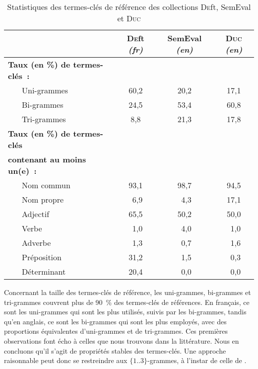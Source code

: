       \begin{table}[!h]
        \centering
        \begin{tabular}{ll|ccc}
          \toprule
          & & \textbf{\textsc{De}ft} \textit{(fr)} & \textbf{SemEval} \textit{(en)} & \textbf{\textsc{Duc}} \textit{(en)}\\
          \hline
          \multicolumn{2}{l|}{\textbf{Taux (en \%) de termes-clés~:}}\\
          & Uni-grammes & 60,2 & 20,2 & 17,1\\
          & Bi-grammes & 24,5 & 53,4 & 60,8\\
          & Tri-grammes & 8,8 & 21,3 & 17,8\\
          \hline
          \multicolumn{2}{l|}{\textbf{Taux (en \%) de termes-clés}} & & &\\
          \multicolumn{2}{l|}{\textbf{contenant au moins un(e)~:}} & & &\\
          & Nom commun & 93,1 & 98,7 & 94,5\\
          & Nom propre & $~~$6,9 & $~~$4,3 & 17,1\\
          & Adjectif & 65,5 & 50,2 & 50,0\\
          & Verbe & $~~$1,0 & $~~$4,0 & $~~$1,0\\
          & Adverbe & $~~$1,3 & $~~$0,7 & $~~$1,6\\
          & Préposition & 31,2 & $~~$1,5 & $~~$0,3\\
          & Déterminant & 20,4 & $~~$0,0 & $~~$0,0\\
          \bottomrule
        \end{tabular}
        \caption{Statistiques des termes-clés de référence des
                 collections \textsc{De}ft, SemEval et \textsc{Duc}
                 \label{tab:candidate_selection-train_stats}}
      \end{table}

      Concernant la taille des termes-clés de référence, les uni-grammes,
      bi-grammes et tri-grammes couvrent plus de 90~\% des termes-clés de
      références. En français, ce sont les uni-grammes qui sont les plus
      utilisés, suivis par les bi-grammes, tandis qu'en anglais, ce sont les
      bi-grammes qui sont les plus employés, avec des proportions équivalentes
      d'uni-grammes et de tri-grammes. Ces premières observations font écho à
      celles que nous trouvons dans la littérature. Nous en concluons qu'il
      s'agit de propriétés stables des termes-clés. Une approche raisonnable peut
      donc se restreindre aux $\{1..3\}$-grammes, à l'instar de celle de
      .

